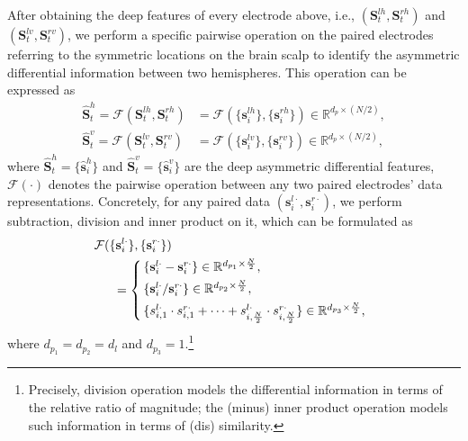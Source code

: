 \documentclass[journal]{IEEEtran}
\begin{document}
After obtaining the deep features of every electrode above, i.e., $(\mathbf{S}_t^{lh}, \mathbf{S}_t^{rh})$ and $(\mathbf{S}_t^{lv}, \mathbf{S}_t^{rv})$, we perform a specific pairwise operation on the paired electrodes referring to the symmetric locations on the brain scalp to identify the asymmetric differential information between two hemispheres. This operation can be expressed as
\begin{eqnarray}
\label{Eq: left differential asymmetric features}
\hat{\mathbf{S}}_t^h =  \mathcal{F}(\mathbf{S}_t^{lh} , \mathbf{S}_t^{rh})\!\!\!\!\! &= \mathcal{F}(\{\mathbf{s}^{lh}_i\} , \{\mathbf{s}^{rh}_i\}) \in \mathbb{R}^{d_p \times (N/2)},\\
\hat{\mathbf{S}}_t^v =  \mathcal{F}(\mathbf{S}_t^{lv} , \mathbf{S}_t^{rv})\!\!\!\!\! &= \mathcal{F}(\{\mathbf{s}^{lv}_i\} , \{\mathbf{s}^{rv}_i\}) \in \mathbb{R}^{d_p \times (N/2)},
\label{Eq: right differential asymmetric features}
\end{eqnarray} 
where $\hat{\mathbf{S}}_t^h \!=\! \{\hat{\mathbf{s}}^h_i\}$ and $\hat{\mathbf{S}}_t^v \!=\! \{\hat{\mathbf{s}}^v_i\}$ are the deep asymmetric differential features, $\mathcal{F}(\cdot)$ denotes the pairwise operation between any two paired electrodes' data representations. Concretely, for any paired data $(\mathbf{s}^{l\cdot}_i, \mathbf{s}^{r\cdot}_i)$, we perform subtraction, division and inner product on it, which can be formulated as
\begin{align}
\label{Eq: pairwise operation}
\mathcal{F}(\{\mathbf{s}^{l\cdot}_i\} , \{\mathbf{s}^{r\cdot}_i\})  ~~~~~~~~~~~~~~~~~~~~~~~~~~~~~~~~~~~~~~~~~~~~~~~~\nonumber\\ =\left\{
\begin{array}{lr}
\!\!\{\mathbf{s}^{l\cdot}_i - \mathbf{s}^{r\cdot}_i\} \in \mathbb{R}^{d_{p_1}\times \frac{N}{2}}, \vspace{0.15cm}\\ 
\!\!\{\mathbf{s}^{l\cdot}_i / \mathbf{s}^{r\cdot}_i\} \in \mathbb{R}^{d_{p_2}\times \frac{N}{2}}, \vspace{0.15cm}\\
\!\!\{s^{l\cdot}_{i,1} \cdot s^{r\cdot}_{i,1} + \cdots + s^{l\cdot}_{i,\frac{N}{2}} \cdot s^{r\cdot}_{i,\frac{N}{2}}\}  \in \mathbb{R}^{d_{p_3}\times \frac{N}{2}},
\end{array}
\right.
\end{align}
where $d_{p_1} = d_{p_2} = d_l$ and $d_{p_3} = 1$.\footnote{Precisely, division operation models the differential information in terms of the relative ratio of magnitude; the (minus) inner product operation models such information in terms of (dis) similarity.}
\end{document}
